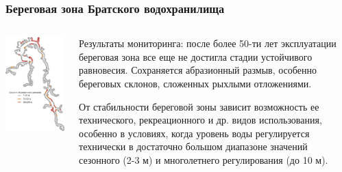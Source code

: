\documentclass[10pt]{beamer}
\begin{document}
\begin{frame}[fragile]
  \frametitle{Береговая зона Братского водохранилища}
  \begin{columns}
    \begin{column}{0.4\linewidth}
      \includegraphics[width=\linewidth]{bratsk-reserv-shores.jpeg}
    \end{column}
    \begin{column}{0.6\linewidth}
      Результаты мониторинга: после более 50-ти лет эксплуатации  береговая зона все еще не достигла стадии устойчивого равновесия.  Сохраняется абразионный размыв, особенно береговых склонов, сложенных рыхлыми отложениями.

\vspace{1em}
От стабильности береговой зоны зависит возможность ее технического, рекреационного и др. видов использования, особенно в условиях, когда уровень воды регулируется технически в достаточно большом диапазоне значений сезонного (2-3 м) и многолетнего регулирования (до 10 м).
    \end{column}
  \end{columns}
\end{frame}
\end{document}
